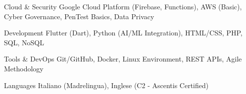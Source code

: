 
\begin{cvskills}

  \cvskill
    {Cloud \& Security}
    {Google Cloud Platform (Firebase, Functions), AWS (Basic), Cyber Governance, PenTest Basics, Data Privacy}

  \cvskill
    {Development}
    {Flutter (Dart), Python (AI/ML Integration), HTML/CSS, PHP, SQL, NoSQL}

  \cvskill
    {Tools \& DevOps}
    {Git/GitHub, Docker, Linux Environment, REST APIs, Agile Methodology}

  \cvskill
    {Languages}
    {Italiano (Madrelingua), Inglese (C2 - Ascentis Certified)}

\end{cvskills}
